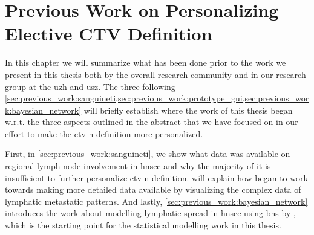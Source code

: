 \documentclass[\relativeRoot/main.tex]{subfiles}
\begin{document}
\chapter[Previous Work on Personalizing CTV-N Definition]{Previous Work on Personalizing Elective CTV Definition}
\label{chap:previous_work}

In this chapter we will summarize what has been done prior to the work we present in this thesis both by the overall research community and in our research group at the \gls{uzh} and \gls{usz}. The three following \cref{sec:previous_work:sanguineti,sec:previous_work:prototype_gui,sec:previous_work:bayesian_network} will briefly establish where the work of this thesis began w.r.t. the three aspects outlined in the abstract that we have focused on in our effort to make the \gls{ctv-n} definition more personalized.

First, in \cref{sec:previous_work:sanguineti}, we show what data was available on regional lymph node involvement in \gls{hnscc} and why the majority of it is insufficient to further personalize \gls{ctv-n} definition.  will explain how  began to work towards making more detailed data available by visualizing the complex data of lymphatic metastatic patterns. And lastly, \cref{sec:previous_work:bayesian_network} introduces the work about modelling lymphatic spread in \gls{hnscc} using \glspl{bn} by , which is the starting point for the statistical modelling work in this thesis.




\end{document}
